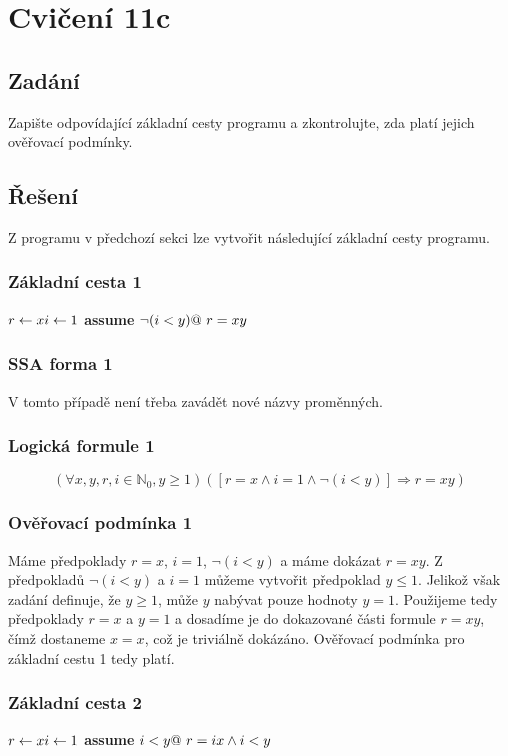 \documentclass{article}
\newcommand{\N}{\mathbb{N}}
\begin{document}
\section{Cvičení 11c}

\subsection{Zadání}
Zapište odpovídající základní cesty programu a zkontrolujte, zda platí jejich ověřovací podmínky.

\subsection{Řešení}
Z programu v předchozí sekci lze vytvořit následující základní cesty programu.

\subsubsection{Základní cesta 1}
$r \leftarrow x \newline i \leftarrow 1 \newline$ \textbf{assume} $\neg(i < y) \newline @\ r = xy$ 

\subsubsection{SSA forma 1}
V tomto případě není třeba zavádět nové názvy proměnných.

\subsubsection{Logická formule 1}
$$(\forall x,y,r,i \in \N_0, y \geq 1)([r = x \wedge i = 1 \wedge \neg(i<y)] \Rightarrow r = xy )$$

\subsubsection{Ověřovací podmínka 1}
Máme předpoklady $r = x$, $i = 1$, $\neg(i < y)$ a máme dokázat $r = xy$. Z předpokladů $\neg(i < y)$ a $i = 1$ můžeme vytvořit předpoklad $y \leq 1$. Jelikož však zadání definuje, že $y \geq 1$, může $y$ nabývat pouze hodnoty $y = 1$. Použijeme tedy předpoklady $r = x$ a $ y = 1$ a dosadíme je do dokazované části formule $r = xy$, čímž dostaneme $x = x$, což je triviálně dokázáno. Ověřovací podmínka pro základní cestu 1 tedy platí.

\subsubsection{Základní cesta 2}
$r \leftarrow x \newline i \leftarrow 1 \newline$ \textbf{assume} $i < y \newline @\ r = ix \wedge i < y$ 
\end{document}
